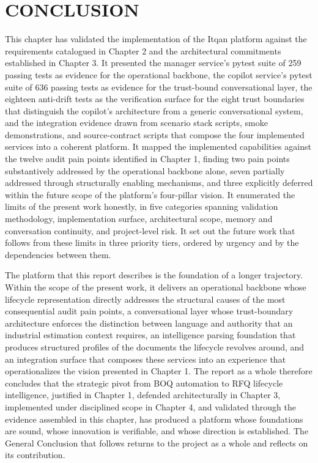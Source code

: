 \section{CONCLUSION}
This chapter has validated the implementation of the Itqan platform against the requirements catalogued in Chapter 2 and the architectural commitments established in Chapter 3. It presented the manager service's pytest suite of 259 passing tests as evidence for the operational backbone, the copilot service's pytest suite of 636 passing tests as evidence for the trust-bound conversational layer, the eighteen anti-drift tests as the verification surface for the eight trust boundaries that distinguish the copilot's architecture from a generic conversational system, and the integration evidence drawn from scenario stack scripts, smoke demonstrations, and source-contract scripts that compose the four implemented services into a coherent platform. It mapped the implemented capabilities against the twelve audit pain points identified in Chapter 1, finding two pain points substantively addressed by the operational backbone alone, seven partially addressed through structurally enabling mechanisms, and three explicitly deferred within the future scope of the platform's four-pillar vision. It enumerated the limits of the present work honestly, in five categories spanning validation methodology, implementation surface, architectural scope, memory and conversation continuity, and project-level risk. It set out the future work that follows from these limits in three priority tiers, ordered by urgency and by the dependencies between them.

The platform that this report describes is the foundation of a longer trajectory. Within the scope of the present work, it delivers an operational backbone whose lifecycle representation directly addresses the structural causes of the most consequential audit pain points, a conversational layer whose trust-boundary architecture enforces the distinction between language and authority that an industrial estimation context requires, an intelligence parsing foundation that produces structured profiles of the documents the lifecycle revolves around, and an integration surface that composes these services into an experience that operationalizes the vision presented in Chapter 1. The report as a whole therefore concludes that the strategic pivot from BOQ automation to RFQ lifecycle intelligence, justified in Chapter 1, defended architecturally in Chapter 3, implemented under disciplined scope in Chapter 4, and validated through the evidence assembled in this chapter, has produced a platform whose foundations are sound, whose innovation is verifiable, and whose direction is established. The General Conclusion that follows returns to the project as a whole and reflects on its contribution.